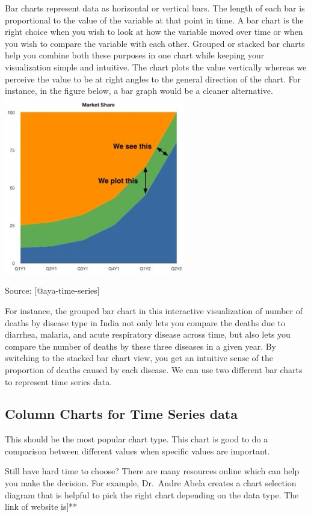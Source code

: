 \documentclass[]{book}
\theoremstyle{definition}
\theoremstyle{definition}
\theoremstyle{definition}
\theoremstyle{remark}
\begin{document}
Bar charts represent data as horizontal or vertical bars. The length of
each bar is proportional to the value of the variable at that point in
time. A bar chart is the right choice when you wish to look at how the
variable moved over time or when you wish to compare the variable with
each other. Grouped or stacked bar charts help you combine both these
purposes in one chart while keeping your visualization simple and
intuitive. The chart plots the value vertically whereas we perceive the
value to be at right angles to the general direction of the chart. For
instance, in the figure below, a bar graph would be a cleaner
alternative. \includegraphics{images/aya-stacked-perception.jpg}

Source: {[}@aya-time-series{]}

For instance, the grouped bar chart in this interactive visualization of
number of deaths by disease type in India not only lets you compare the
deaths due to diarrhea, malaria, and acute respiratory disease across
time, but also lets you compare the number of deaths by these three
diseases in a given year. By switching to the stacked bar chart view,
you get an intuitive sense of the proportion of deaths caused by each
disease. We can use two different bar charts to represent time series
data.

\subsection{Column Charts for Time Series
data}\label{column-charts-for-time-series-data}

This should be the most popular chart type. This chart is good to do a
comparison between different values when specific values are important.

Still have hard time to choose? There are many resources online which
can help you make the decision. For example, Dr.~Andre Abela creates a
chart selection diagram that is helpful to pick the right chart
depending on the data type. The link of website is{]}**
\end{document}
